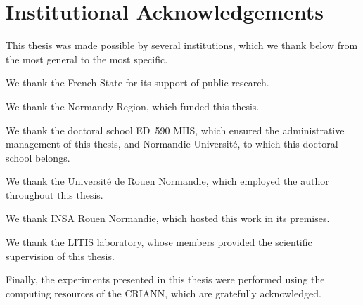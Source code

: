 \chapter*{Institutional Acknowledgements}
\label{chap:institutional_acknowledgements}

This thesis was made possible by several institutions, which we thank below from the most general to the most specific.

We thank the French State for its support of public research.

We thank the Normandy Region, which funded this thesis.

We thank the doctoral school ED~590 MIIS, which ensured the administrative management of this thesis, and Normandie Université, to which this doctoral school belongs.

We thank the Université de Rouen Normandie, which employed the author throughout this thesis.

We thank INSA Rouen Normandie, which hosted this work in its premises.

We thank the LITIS laboratory, whose members provided the scientific supervision of this thesis.

Finally, the experiments presented in this thesis were performed using the computing resources of the CRIANN, which are gratefully acknowledged.


